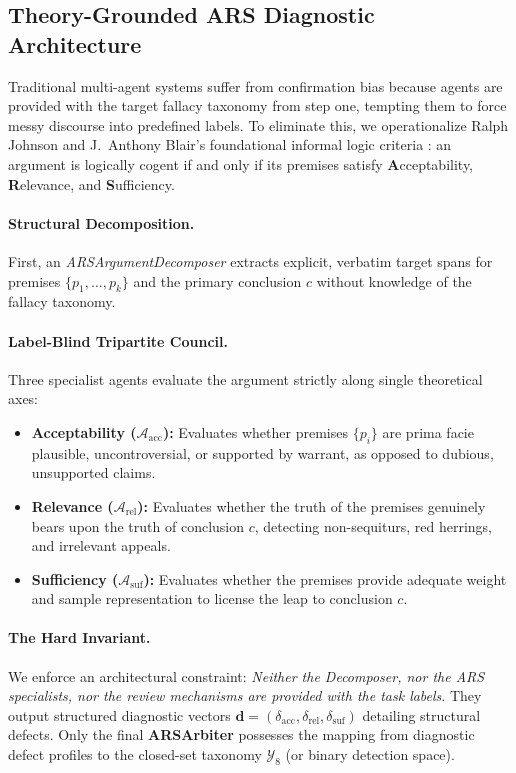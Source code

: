 \documentclass[11pt]{article}
\begin{document}
\subsection{Theory-Grounded ARS Diagnostic Architecture}
Traditional multi-agent systems suffer from confirmation bias because agents are provided with the target fallacy taxonomy from step one, tempting them to force messy discourse into predefined labels. To eliminate this, we operationalize Ralph Johnson and J.~Anthony Blair's foundational informal logic criteria \cite{johnsonblair1977,johnsonblair2006}: an argument is logically cogent if and only if its premises satisfy \textbf{A}cceptability, \textbf{R}elevance, and \textbf{S}ufficiency.

\paragraph{Structural Decomposition.}
First, an \textit{ARSArgumentDecomposer} extracts explicit, verbatim target spans for premises $\{p_1, \dots, p_k\}$ and the primary conclusion $c$ without knowledge of the fallacy taxonomy.

\paragraph{Label-Blind Tripartite Council.}
Three specialist agents evaluate the argument strictly along single theoretical axes:
\begin{itemize}[leftmargin=*,itemsep=1pt,topsep=2pt]
    \item \textbf{Acceptability ($\mathcal{A}_{\text{acc}}$):} Evaluates whether premises $\{p_i\}$ are prima facie plausible, uncontroversial, or supported by warrant, as opposed to dubious, unsupported claims.
    \item \textbf{Relevance ($\mathcal{A}_{\text{rel}}$):} Evaluates whether the truth of the premises genuinely bears upon the truth of conclusion $c$, detecting non-sequiturs, red herrings, and irrelevant appeals.
    \item \textbf{Sufficiency ($\mathcal{A}_{\text{suf}}$):} Evaluates whether the premises provide adequate weight and sample representation to license the leap to conclusion $c$.
\end{itemize}

\paragraph{The Hard Invariant.}
We enforce an architectural constraint: \textit{Neither the Decomposer, nor the ARS specialists, nor the review mechanisms are provided with the task labels}. They output structured diagnostic vectors $\mathbf{d} = (\delta_{\text{acc}}, \delta_{\text{rel}}, \delta_{\text{suf}})$ detailing structural defects. Only the final \textbf{ARSArbiter} possesses the mapping from diagnostic defect profiles to the closed-set taxonomy $\mathcal{Y}_{\text{8}}$ (or binary detection space).
\end{document}

